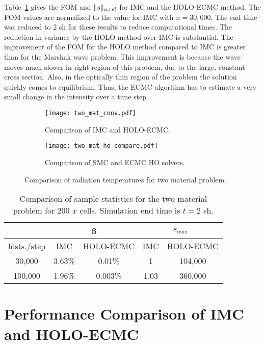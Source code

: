 Table~\ref{twomat_var} gives the FOM and $\ss$ for IMC and the HOLO-ECMC method.  The FOM
values are normalized to the value for IMC with $n=30,000$.  The end time was reduced
to $2$ sh for these results to reduce computational times. The reduction in variance by
the HOLO method over IMC is substantial. The improvement of the FOM for the HOLO
method compared to IMC is greater than for the
Marshak wave problem.  This improvement is because the wave moves much slower in
right region of this problem, due to
the large, constant cross section.  Also, in the optically thin
region of the problem the solution quickly comes to equilibrium.  Thus, the ECMC
algorithm has to estimate a very small change in the intensity over a time step.  
\begin{figure}[H]
    \centering
\begin{subfigure}{0.65\textwidth}
    \centering
    \texttt{[image: two\_mat\_conv.pdf]}
    \caption{Comparison of IMC and HOLO-ECMC.\label{twomat_full}}
\end{subfigure}    \begin{subfigure}{0.65\textwidth}
\centering
    \texttt{[image: two\_mat\_ho\_compare.pdf]}
    \caption{Comparison of SMC and ECMC HO solvers. \label{compare_ho}}
\end{subfigure}
    \caption{ Comparison of radiation temperatures for two material problem. \label{twomat}}
\end{figure}


\begin{table}[H]
\centering
\caption{\label{twomat_var} {Comparison of sample statistics for the
    two material problem for 200 $x$ cells.   Simulation end time is ${t=2}$ sh.}}
\vspace{-0.1in}
\begin{tabular}{|c|cc|cc|}\cline{2-5}
    \multicolumn{1}{c|}{}       & \multicolumn{2}{|c|}{\ss} & \multicolumn{2}{|c|}{$s_{\max}$} \\ \hline
hists./step     & IMC & HOLO-ECMC  &  IMC & HOLO-ECMC   \\ \hline
   30,000	    & 3.63\%  & 0.01\% &  1      &   104,000      \\
  100,000       & 1.96\%  & 0.003\% & 1.03   &   360,000      \\ \hline
\end{tabular}
\end{table}

\section{Performance Comparison of IMC and HOLO-ECMC}
\label{timing}

